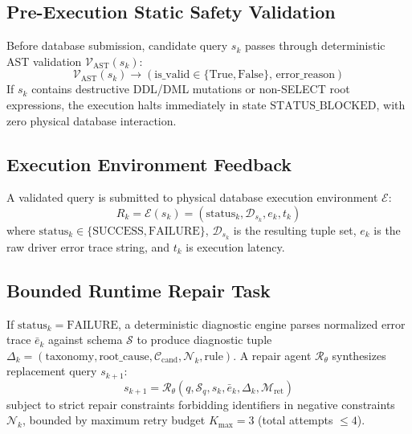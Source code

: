 \documentclass[conference]{IEEEtran}
\begin{document}
\subsection{Pre-Execution Static Safety Validation}
Before database submission, candidate query $s_k$ passes through deterministic AST validation $\mathcal{V}_{\text{AST}}(s_k)$:
\begin{equation}
\mathcal{V}_{\text{AST}}(s_k) \to (\text{is\_valid} \in \{\text{True}, \text{False}\}, \, \text{error\_reason})
\end{equation}
If $s_k$ contains destructive DDL/DML mutations or non-SELECT root expressions, the execution halts immediately in state $\text{STATUS\_BLOCKED}$, with zero physical database interaction.

\subsection{Execution Environment Feedback}
A validated query is submitted to physical database execution environment $\mathcal{E}$:
\begin{equation}
R_k = \mathcal{E}(s_k) = (\text{status}_k, \mathcal{D}_{s_k}, e_k, t_k)
\end{equation}
where $\text{status}_k \in \{\text{SUCCESS}, \text{FAILURE}\}$, $\mathcal{D}_{s_k}$ is the resulting tuple set, $e_k$ is the raw driver error trace string, and $t_k$ is execution latency.

\subsection{Bounded Runtime Repair Task}
If $\text{status}_k = \text{FAILURE}$, a deterministic diagnostic engine parses normalized error trace $\bar{e}_k$ against schema $\mathcal{S}$ to produce diagnostic tuple $\Delta_k = (\text{taxonomy}, \text{root\_cause}, \mathcal{C}_{\text{cand}}, \mathcal{N}_k, \text{rule})$. A repair agent $\mathcal{R}_{\theta}$ synthesizes replacement query $s_{k+1}$:
\begin{equation}
s_{k+1} = \mathcal{R}_{\theta}(q, \mathcal{S}_q, s_k, \bar{e}_k, \Delta_k, \mathcal{M}_{\text{ret}})
\end{equation}
subject to strict repair constraints forbidding identifiers in negative constraints $\mathcal{N}_k$, bounded by maximum retry budget $K_{\max} = 3$ (total attempts $\le 4$).
\end{document}
